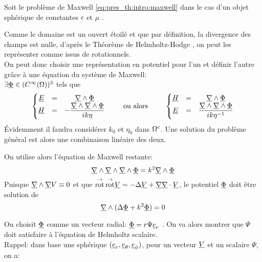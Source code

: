 Soit le problème de Maxwell \eqref{eq:pres_th:intro:maxwell} dans le cas d'un objet sphérique de constantes $\epsilon$ et $\mu$%
.

Comme le domaine est un ouvert étoilé et que par définition, la divergence des champs est nulle, d'après le Théorème de Helmholtz-Hodge \cite{gui_rigorous_2007}, on peut les représenter comme issus de rotationnels.\\
On peut donc choisir une représentation en potentiel pour l'un et définir l'autre grâce à une équation du système de Maxwell:\\
 $\exists \underline{\Phi} \in (C^\infty(\Omega))^3$ tels que
\begin{equation}
  \label{eq:sol_maxwell:pot_hertz}
  \left\lbrace\begin{matrix}
    \underline{E} &=& \underline{\nabla} \wedge \underline{\Phi} \\
    \underline{H} &=& - \dfrac{\underline{\nabla} \wedge \underline{\nabla} \wedge \underline{\Phi}}{ik\eta}
  \end{matrix} \right.
  \qquad \text{ ou alors } \qquad
  \left\lbrace\begin{matrix}
    \underline{H} &=& \underline{\nabla} \wedge \underline{\Phi}\\
    \underline{E} &=& \dfrac{\underline{\nabla} \wedge \underline{\nabla} \wedge \underline{\Phi}}{ik\eta^{-1}}\\
  \end{matrix}\right.
\end{equation}
Évidemment il faudra considérer $k_0$ et $\eta_0$ dans $\Omega^c$. Une solution du problème général est alors une combinaison linéaire des deux.

On utilise alors l'équation de Maxwell restante:
\[
    \underline{\nabla} \wedge \underline{\nabla} \wedge \underline{\nabla} \wedge \underline{\Phi} = k^2 \underline{\nabla} \wedge \underline{\Phi} \\
\]
Puisque $\underline{\nabla} \wedge  \underline{\nabla}  V  \equiv 0$ et que ${{\overset{\rightarrow}{\operatorname{rot}}}}\, {{\overset{\rightarrow}{\operatorname{rot}}}} \underline{V} = -\Delta \underline{V} + \underline{\nabla} \underline{\nabla} \cdot \underline{V}$, le potentiel $\underline{\Phi}$ doit être solution de 
\begin{equation}
  \label{eq:sol_maxwell:helmholtz_vect}
  \underline{\nabla} \wedge ( \Delta \underline{\Phi} + k^2 \underline{\Phi} ) = 0
\end{equation}

On choisit $\underline{\Phi}$ comme un vecteur radial: $\underline{\Phi} = r \Psi \underline{e}_r$ \cite[p.~84]{bohren_absorption_2004}. On va alors montrer que $\Psi$ doit satisfaire à l'équation de Helmholtz scalaire.\\

Rappel: dans base une sphérique $(\underline{e}_r, \underline{e}_\theta, \underline{e}_\phi)$, pour 
un vecteur $\underline{V}$ 
et un scalaire $\Psi$, on a:

